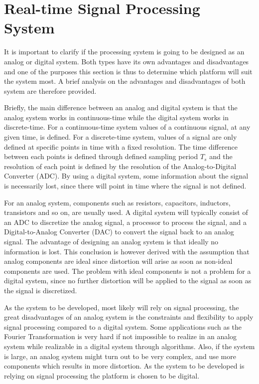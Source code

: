 \section{Real-time Signal Processing System}

It is important to clarify if the processing system is going to be designed as an analog or digital system. Both types have its own advantages and disadvantages and one of the purposes this section is thus to determine which platform will suit the system most. A brief analysis on the advantages and disadvantages of both system are therefore provided. 

Briefly, the main difference between an analog and digital system is that the analog system works in continuous-time while the digital system works in discrete-time. For a continuous-time system values of a continuous signal, at any given time, is defined. For a discrete-time system, values of a signal are only defined at specific points in time with a fixed resolution. The time difference between each points is defined through defined sampling period $T_s$ and the resolution of each point is defined by the resolution of the Analog-to-Digital Converter (ADC). By using a digital system, some information about the signal is necessarily lost, since there will point in time where the signal is not defined.

For an analog system, components such as resistors, capacitors, inductors, transistors and so on, are usually used. A digital system will typically consist of an ADC to discretize the analog signal, a processor to process the signal, and a Digital-to-Analog Converter (DAC) to convert the signal back to an analog signal. The advantage of designing an analog system is that ideally no information is lost. This conclusion is however derived with the assumption that analog components are ideal since distortion will arise as soon as non-ideal components are used. The problem with ideal components is not a problem for a digital system, since no further distortion will be applied to the signal as soon as the signal is discretized.

As the system to be developed, most likely will rely on signal processing, the great disadvantages of an analog system is the constraints and flexibility to apply signal processing compared to a digital system. Some applications such as the Fourier Transformation is very hard if not impossible to realize in an analog system while realizable in a digital system through algorithms. Also, if the system is large, an analog system might turn out to be very complex, and use more components which results in more distortion. As the system to be developed is relying on signal processing the platform is chosen to be digital.


